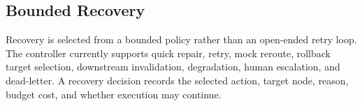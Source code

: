 \subsection{Bounded Recovery}

Recovery is selected from a bounded policy rather than an open-ended retry loop. The controller currently supports quick repair, retry, mock reroute, rollback target selection, downstream invalidation, degradation, human escalation, and dead-letter. A recovery decision records the selected action, target node, reason, budget cost, and whether execution may continue.
